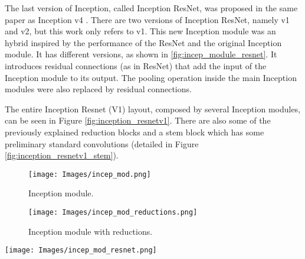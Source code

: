 The last version of Inception, called Inception ResNet, was proposed in the same paper as Inception v4 \cite{inceptionresnet}. There are two versions of Inception ResNet, namely v1 and v2, but this work only refers to v1. This new Inception module was an hybrid inspired by the performance of the ResNet and the original Inception module. It has different versions, as shown in \ref{fig:incep_module_resnet}. It introduces residual connections (as in ResNet) that add the input of the Inception module to its output. The pooling operation inside the main Inception modules were also replaced by residual connections.

The entire Inception Resnet (V1) layout, composed by several Inception modules, can be seen in Figure \ref{fig:inception_resnetv1}. There are also some of the previously explained reduction blocks and a stem block which has some preliminary standard convolutions (detailed in Figure \ref{fig:inception_resnetv1_stem}).

\begin{figure*}[htbp]
        \centering
        \begin{subfigure}[b]{\textwidth}
            \centering
            \texttt{[image: Images/incep\_mod.png]}
              \caption[Inception module.]
        	 {\small Inception module.}   
            \label{fig:incep_module}
        \end{subfigure}
        \hfill
        \begin{subfigure}[b]{\textwidth}
            \centering
            \texttt{[image: Images/incep\_mod\_reductions.png]}
             \caption[Inception module with reductions.]
            {\small Inception module with reductions.}   
            \label{fig:incep_module_red}
        \end{subfigure}
       \caption[Inception module and inception module with reductions \cite{inceptionv1}.]
        {\small Inception module and inception module with reductions \cite{inceptionv1}.}    
        \label{fig:inception_modules}
    \end{figure*}

\begin{figure*}[htbp]
        \centering
            \texttt{[image: Images/incep\_mod\_resnet.png]}
             \caption[Versions of the Inception Resnet module \cite{inceptionresnet}.]
            {\small Versions of the Inception Resnet module \cite{inceptionresnet}.}   
            \label{fig:incep_module_resnet}
    \end{figure*}

